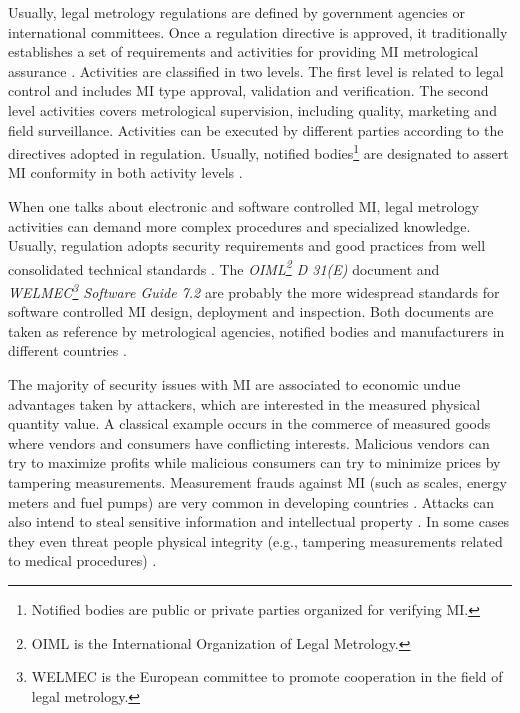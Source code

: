 \documentclass[conference]{IEEEtran}
\begin{document}
Usually, legal metrology regulations are defined by government agencies or international committees. Once a regulation directive is approved, it traditionally establishes a set of requirements and activities for providing MI metrological assurance \cite{RodriguesFilho2015}. Activities are classified in two levels. The first level is related to legal control and includes MI type approval, validation and verification. The second level activities covers metrological supervision, including quality, marketing and field surveillance. Activities can be executed by different parties according to the directives adopted in regulation. Usually, notified bodies\footnote{Notified bodies are public or private parties organized for verifying MI.} are designated to assert MI conformity in both activity levels \cite{Esche2015,Oppermann2016}. 

When one talks about electronic and software controlled MI, legal metrology activities can demand more complex procedures and specialized knowledge. Usually, regulation adopts security requirements and good practices from well consolidated technical standards \cite{Esche2015,Peters2015,Luchsinger2008}. The \emph{OIML\footnote{OIML is the International Organization of Legal Metrology.} D 31(E)} document and \emph{WELMEC\footnote{WELMEC is the European committee to promote cooperation in the field of legal metrology.} Software Guide 7.2} are probably the more widespread standards for software controlled MI design, deployment and inspection. Both documents are taken as reference by metrological agencies, notified bodies and manufacturers in different countries \cite{Camara2012,Peters2015}.

The majority of security issues with MI are associated to economic undue advantages taken by attackers, which are interested in the measured physical quantity value. A classical example occurs in the commerce of measured goods where vendors and consumers have conflicting interests\cite{RodriguesFilho2015}. Malicious vendors can try to maximize profits while malicious consumers can try to minimize prices by tampering measurements. Measurement frauds against MI (such as scales, energy meters and fuel pumps) are very common in developing countries \cite{Camara2012,Luchsinger2008}. Attacks can also intend to steal sensitive information and intellectual property \cite{Camara2012,Oppermann2016,Castro2017}. In some cases they even threat people physical integrity (e.g., tampering measurements related to medical procedures) \cite{Boccardo2014}.
\end{document}
